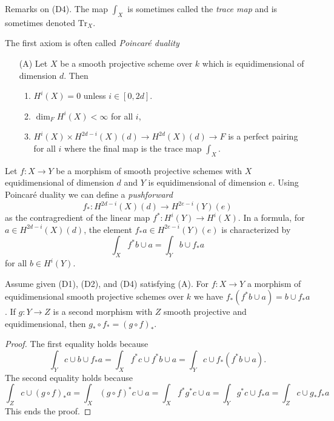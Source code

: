 \medskip\noindent
Remarks on (D4). The map $\int_X$ is sometimes called the
{\it trace map} and is sometimes denoted $\text{Tr}_X$.

\medskip\noindent
The first axiom is often called {\it Poincar\'e duality}
\begin{enumerate}
\item[(A)] Let $X$ be a smooth projective scheme over $k$
which is equidimensional of dimension $d$. Then
\begin{enumerate}
\item $H^i(X) = 0$ unless $i \in [0, 2d]$.
\item $\dim_F H^i(X) < \infty$ for all $i$,
\item $H^i(X) \times H^{2d - i}(X)(d) \rightarrow
H^{2d}(X)(d) \rightarrow F$
is a perfect pairing for all $i$ where the final
map is the trace map $\int_X$.
\end{enumerate}
\end{enumerate}
Let $f : X \to Y$ be a morphism of smooth projective schemes with $X$
equidimensional of dimension $d$ and $Y$ is equidimensional of dimension $e$.
Using Poincar\'e duality we can define a {\it pushforward}
$$
f_* : H^{2d - i}(X)(d) \longrightarrow H^{2e - i}(Y)(e)
$$
as the contragredient of the linear map $f^* : H^i(Y) \to H^i(X)$. In a
formula, for $a \in H^{2d - i}(X)(d)$, the element $f_*a \in H^{2e - i}(Y)(e)$
is characterized by
$$
\int_X f^*b \cup a = \int_Y b \cup f_*a
$$
for all $b \in H^i(Y)$.

\begin{lemma}
\label{lemma-pushforward}
Assume given (D1), (D2), and (D4) satisfying (A). For $f : X \to Y$
a morphism of equidimensional smooth projective schemes over $k$ we have
$f_*(f^*b \cup a) = b \cup f_*a$. If $g : Y \to Z$ is a second morphism
with $Z$ smooth projective and equidimensional, then
$g_* \circ f_* = (g \circ f)_*$.
\end{lemma}

\begin{proof}
The first equality holds because
$$
\int_Y c \cup b \cup f_*a =
\int_X f^*c \cup f^*b \cup a =
\int_Y c \cup f_*(f^*b \cup a).
$$
The second equality holds because
$$
\int_Z c \cup (g \circ f)_*a = \int_X (g \circ f)^*c \cup a =
\int_X f^* g^* c \cup a = \int_Y g^*c \cup f_*a = \int_Z c \cup g_*f_*a
$$
This ends the proof.
\end{proof}

